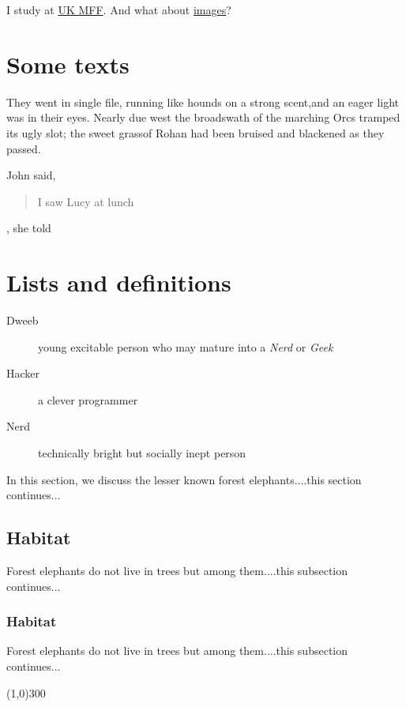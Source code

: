 \documentclass[a4paper,11pt]{article} \usepackage{ulem}
\newcommand{\MYp}[1]{ {\color[rgb]{0.392,0.392,0.392}#1} }
\newcommand{\MYbigred}[1]{ {\color{red}{\LARGE#1}} }
\begin{document}
\MYp{I study at \href{http://www.mff.cuni.cz}{UK MFF}. And what about
  \hyperlink{img}{images}?}

\section{Some texts}

\MYp{
  \begin{center}
    They went in single file, running like hounds on a strong
    scent,and an eager light was in their eyes. Nearly due west the
    broadswath of the marching \scriptsize Orcs tramped \normalsize
    its ugly slot; the sweet grassof Rohan had been bruised and
    blackened as they passed.
  \end{center}}

\MYp{John said, \begin{quote}I saw Lucy at lunch\end{quote}, she told}

\section{Lists and definitions}
\begin{description}
\item[Dweeb] young excitable person who may mature into a \emph{Nerd}
  or \emph{Geek}
\item[Hacker] a clever programmer
\item[Nerd] technically bright but socially inept person
\end{description}

\MYp{In this section, we discuss the lesser known forest
  elephants....this section continues...}

\subsection{Habitat}

\MYp{Forest elephants do not live in trees but among them....this
  subsection continues... }

\subsubsection{Habitat}

\MYp{Forest elephants do not live in trees but among them....this
  subsection continues...  \textbf{\MYbigred{AND A LINE FOLLOWS}}}

\line(1,0){300}
\end{document}
